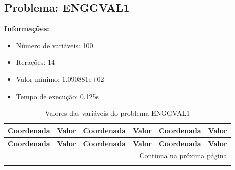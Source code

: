\documentclass[12pt]{article}
\begin{document}
\newpage            
\subsection{Problema: ENGGVAL1}

\textbf{Informações:}
\begin{itemize}
\item Número de variáveis: 100
\item Iterações: 14
\item Valor mínimo: 1.090881e+02
\item Tempo de execução: 0.125s
\end{itemize}

\small
\begin{longtable}{@{}cc|cc|cc@{}}
\caption{Valores das variáveis do problema ENGGVAL1} \\
\toprule
\textbf{Coordenada} & \textbf{Valor} & \textbf{Coordenada} & \textbf{Valor} & \textbf{Coordenada} & \textbf{Valor} \\
\midrule
\endfirsthead

\toprule
\textbf{Coordenada} & \textbf{Valor} & \textbf{Coordenada} & \textbf{Valor} & \textbf{Coordenada} & \textbf{Valor} \\
\midrule
\endhead

\midrule \multicolumn{6}{r}{{Continua na próxima página}} \\ \midrule
\endfoot


\end{longtable}
\end{document}
